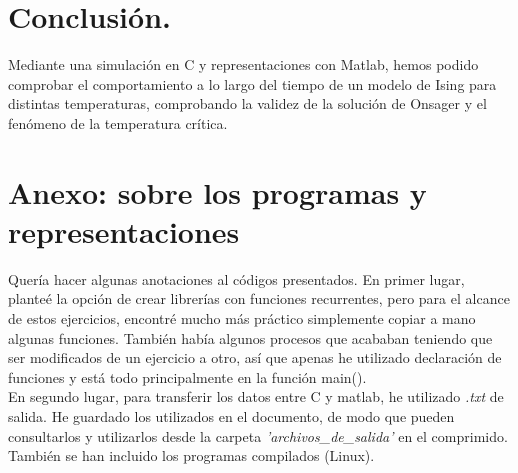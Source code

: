\documentclass[a4paper,12pt,spanish]{article}
\begin{document}
\section{Conclusión.}

Mediante una simulación en C y representaciones con Matlab, hemos podido comprobar el comportamiento a lo largo del tiempo de un modelo de Ising para distintas temperaturas, comprobando la validez de la solución de Onsager y el fenómeno de la temperatura crítica.


\section*{Anexo: sobre los programas y representaciones}

Quería hacer algunas anotaciones al códigos presentados. En primer lugar, planteé la opción de crear librerías con funciones recurrentes, pero para el alcance de estos ejercicios, encontré mucho más práctico simplemente copiar a mano algunas funciones. También había algunos procesos que acababan teniendo que ser modificados de un ejercicio a otro, así que apenas he utilizado declaración de funciones y está todo principalmente en la función main().\\


En segundo lugar, para transferir los datos entre C y matlab, he utilizado \textit{.txt} de salida. He guardado los utilizados en el documento, de modo que pueden consultarlos y utilizarlos desde la carpeta \textit{'archivos\_de\_salida'} en el comprimido. También se han incluido los programas compilados (Linux).



	
\end{document}
